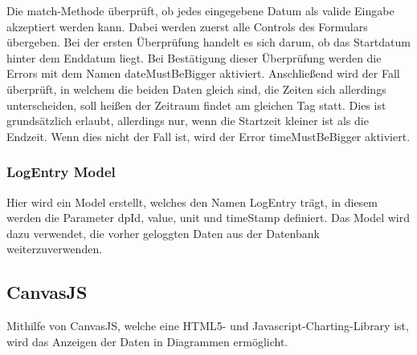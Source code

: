 Die match-Methode überprüft, ob jedes eingegebene Datum als valide Eingabe akzeptiert werden kann. Dabei werden zuerst alle Controls des Formulars übergeben. Bei der ersten Überprüfung handelt es sich darum, ob das Startdatum hinter dem Enddatum liegt. Bei Bestätigung dieser Überprüfung werden die Errors mit dem Namen dateMustBeBigger aktiviert. Anschließend wird der Fall überprüft, in welchem die beiden Daten gleich sind, die Zeiten sich allerdings unterscheiden, soll heißen der Zeitraum findet am gleichen Tag statt. Dies ist grundsätzlich erlaubt, allerdings nur, wenn die Startzeit kleiner ist als die Endzeit. Wenn dies nicht der Fall ist, wird der Error timeMustBeBigger aktiviert.
 
\subsubsection{LogEntry Model}
Hier wird ein Model erstellt, welches den Namen LogEntry trägt, in diesem werden die Parameter dpId, value, unit und timeStamp definiert. Das Model wird dazu verwendet, die vorher geloggten Daten aus der Datenbank weiterzuverwenden.
 
\subsection{CanvasJS}
Mithilfe von CanvasJS, welche eine HTML5- und Javascript-Charting-Library ist, wird das Anzeigen der Daten in Diagrammen ermöglicht.
